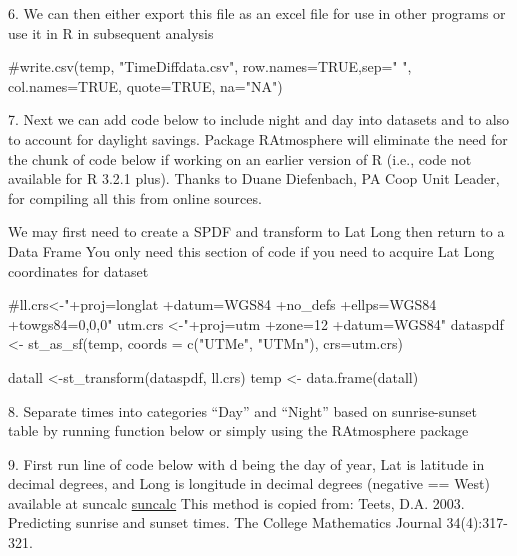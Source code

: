 \documentclass[
  letterpaper,
]{book}
\newenvironment{Shaded}{\begin{snugshade}}{\end{snugshade}}
\newcommand{\AttributeTok}[1]{\textcolor[rgb]{0.40,0.45,0.13}{#1}}
\newcommand{\CommentTok}[1]{\textcolor[rgb]{0.37,0.37,0.37}{#1}}
\newcommand{\FunctionTok}[1]{\textcolor[rgb]{0.28,0.35,0.67}{#1}}
\newcommand{\NormalTok}[1]{\textcolor[rgb]{0.00,0.23,0.31}{#1}}
\newcommand{\OtherTok}[1]{\textcolor[rgb]{0.00,0.23,0.31}{#1}}
\newcommand{\StringTok}[1]{\textcolor[rgb]{0.13,0.47,0.30}{#1}}
\begin{document}
6. We can then either export this file as an excel file for use in other
programs or use it in R in subsequent analysis

\begin{Shaded}
\begin{Highlighting}[]
\CommentTok{\#write.csv(temp, "TimeDiffdata.csv", row.names=TRUE,sep=" ", col.names=TRUE, quote=TRUE, na="NA")}
\end{Highlighting}
\end{Shaded}

7. Next we can add code below to include night and day into datasets and
to also to account for daylight savings. Package RAtmosphere will
eliminate the need for the chunk of code below if working on an earlier
version of R (i.e., code not available for R 3.2.1 plus). Thanks to
Duane Diefenbach, PA Coop Unit Leader, for compiling all this from
online sources.

We may first need to create a SPDF and transform to Lat Long then return
to a Data Frame You only need this section of code if you need to
acquire Lat Long coordinates for dataset

\begin{Shaded}
\begin{Highlighting}[]
\CommentTok{\#ll.crs\textless{}{-}"+proj=longlat +datum=WGS84 +no\_defs +ellps=WGS84 +towgs84=0,0,0"}
\NormalTok{utm.crs }\OtherTok{\textless{}{-}}\StringTok{"+proj=utm +zone=12 +datum=WGS84"}
\NormalTok{dataspdf }\OtherTok{\textless{}{-}} \FunctionTok{st\_as\_sf}\NormalTok{(temp, }\AttributeTok{coords =} \FunctionTok{c}\NormalTok{(}\StringTok{"UTMe"}\NormalTok{, }\StringTok{"UTMn"}\NormalTok{), }\AttributeTok{crs=}\NormalTok{utm.crs)}

\NormalTok{datall }\OtherTok{\textless{}{-}}\FunctionTok{st\_transform}\NormalTok{(dataspdf, ll.crs)}
\NormalTok{temp }\OtherTok{\textless{}{-}} \FunctionTok{data.frame}\NormalTok{(datall)}
\end{Highlighting}
\end{Shaded}

8. Separate times into categories ``Day'' and ``Night'' based on
sunrise-sunset table by running function below or simply using the
RAtmosphere package

9. First run line of code below with d being the day of year, Lat is
latitude in decimal degrees, and Long is longitude in decimal degrees
(negative == West) available at suncalc
\href{http://www.r-bloggers.com/approximate-sunrise-and-sunset-times/}{suncalc}
This method is copied from: Teets, D.A. 2003. Predicting sunrise and
sunset times. The College Mathematics Journal 34(4):317-321.
\end{document}
